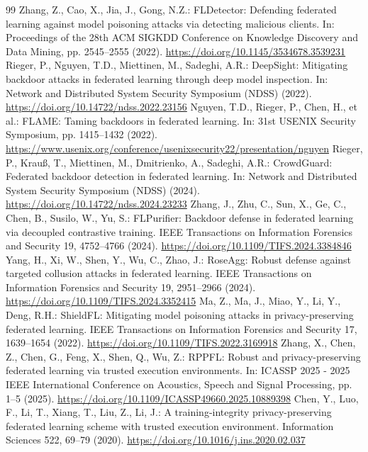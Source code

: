 \documentclass[10pt,a4paper,UTF8,fontset=fandol]{ctexart}
\begin{document}
\begin{thebibliography}{99}
     Zhang, Z., Cao, X., Jia, J., Gong, N.Z.: FLDetector: Defending federated learning against model poisoning attacks via detecting malicious clients. In: Proceedings of the 28th ACM SIGKDD Conference on Knowledge Discovery and Data Mining, pp. 2545--2555 (2022). \url{https://doi.org/10.1145/3534678.3539231}
     Rieger, P., Nguyen, T.D., Miettinen, M., Sadeghi, A.R.: DeepSight: Mitigating backdoor attacks in federated learning through deep model inspection. In: Network and Distributed System Security Symposium (NDSS) (2022). \url{https://doi.org/10.14722/ndss.2022.23156}
     Nguyen, T.D., Rieger, P., Chen, H., et al.: FLAME: Taming backdoors in federated learning. In: 31st USENIX Security Symposium, pp. 1415--1432 (2022). \url{https://www.usenix.org/conference/usenixsecurity22/presentation/nguyen}
     Rieger, P., Krau{\ss}, T., Miettinen, M., Dmitrienko, A., Sadeghi, A.R.: CrowdGuard: Federated backdoor detection in federated learning. In: Network and Distributed System Security Symposium (NDSS) (2024). \url{https://doi.org/10.14722/ndss.2024.23233}
     Zhang, J., Zhu, C., Sun, X., Ge, C., Chen, B., Susilo, W., Yu, S.: FLPurifier: Backdoor defense in federated learning via decoupled contrastive training. IEEE Transactions on Information Forensics and Security 19, 4752--4766 (2024). \url{https://doi.org/10.1109/TIFS.2024.3384846}
     Yang, H., Xi, W., Shen, Y., Wu, C., Zhao, J.: RoseAgg: Robust defense against targeted collusion attacks in federated learning. IEEE Transactions on Information Forensics and Security 19, 2951--2966 (2024). \url{https://doi.org/10.1109/TIFS.2024.3352415}
     Ma, Z., Ma, J., Miao, Y., Li, Y., Deng, R.H.: ShieldFL: Mitigating model poisoning attacks in privacy-preserving federated learning. IEEE Transactions on Information Forensics and Security 17, 1639--1654 (2022). \url{https://doi.org/10.1109/TIFS.2022.3169918}
     Zhang, X., Chen, Z., Chen, G., Feng, X., Shen, Q., Wu, Z.: RPPFL: Robust and privacy-preserving federated learning via trusted execution environments. In: ICASSP 2025 - 2025 IEEE International Conference on Acoustics, Speech and Signal Processing, pp. 1--5 (2025). \url{https://doi.org/10.1109/ICASSP49660.2025.10889398}
     Chen, Y., Luo, F., Li, T., Xiang, T., Liu, Z., Li, J.: A training-integrity privacy-preserving federated learning scheme with trusted execution environment. Information Sciences 522, 69--79 (2020). \url{https://doi.org/10.1016/j.ins.2020.02.037}

\end{thebibliography}
\end{document}
